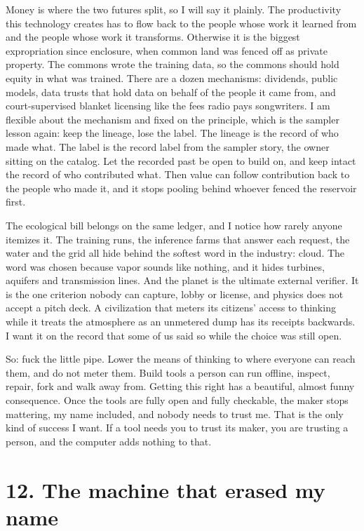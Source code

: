 \documentclass[11pt]{article}
\begin{document}
Money is where the two futures split, so I will say it plainly. The productivity this technology creates has to flow back to the people whose work it learned from and the people whose work it transforms. Otherwise it is the biggest expropriation since enclosure, when common land was fenced off as private property. The commons wrote the training data, so the commons should hold equity in what was trained. There are a dozen mechanisms: dividends, public models, data trusts that hold data on behalf of the people it came from, and court-supervised blanket licensing like the fees radio pays songwriters. I am flexible about the mechanism and fixed on the principle, which is the sampler lesson again: keep the lineage, lose the label. The lineage is the record of who made what. The label is the record label from the sampler story, the owner sitting on the catalog. Let the recorded past be open to build on, and keep intact the record of who contributed what. Then value can follow contribution back to the people who made it, and it stops pooling behind whoever fenced the reservoir first.

The ecological bill belongs on the same ledger, and I notice how rarely anyone itemizes it. The training runs, the inference farms that answer each request, the water and the grid all hide behind the softest word in the industry: cloud. The word was chosen because vapor sounds like nothing, and it hides turbines, aquifers and transmission lines. And the planet is the ultimate external verifier. It is the one criterion nobody can capture, lobby or license, and physics does not accept a pitch deck. A civilization that meters its citizens' access to thinking while it treats the atmosphere as an unmetered dump has its receipts backwards. I want it on the record that some of us said so while the choice was still open.

So: fuck the little pipe. Lower the means of thinking to where everyone can reach them, and do not meter them. Build tools a person can run offline, inspect, repair, fork and walk away from. Getting this right has a beautiful, almost funny consequence. Once the tools are fully open and fully checkable, the maker stops mattering, my name included, and nobody needs to trust me. That is the only kind of success I want. If a tool needs you to trust its maker, you are trusting a person, and the computer adds nothing to that.

\section*{12. The machine that erased my name}
\end{document}
